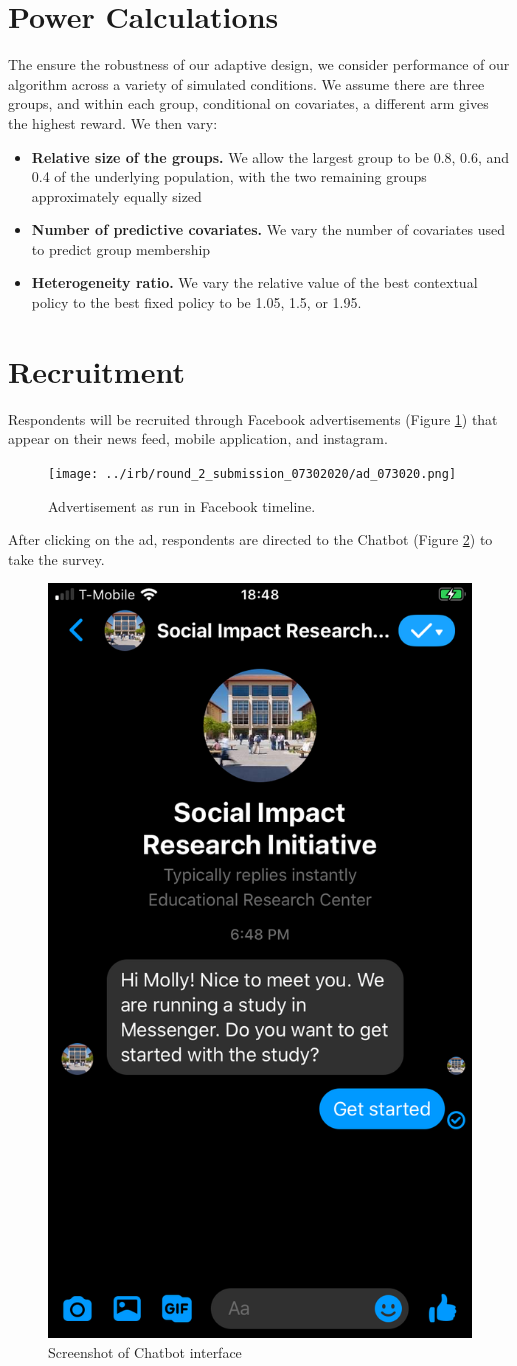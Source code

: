 \documentclass[letterpaper, 12pt, parskip=full,]{scrartcl}
\begin{document}
\section{Power Calculations}
The ensure the robustness of our adaptive design, we consider performance of our algorithm across a variety of simulated conditions. We assume there are three groups, and within each group, conditional on covariates, a different arm gives the highest reward. We then vary:
\begin{itemize}
\item \textbf{Relative size of the groups.} We allow the largest group to be 0.8, 0.6, and 0.4 of the underlying population, with the two remaining groups approximately equally sized
\item \textbf{Number of predictive covariates.} We vary the number of covariates used to predict group membership
\item \textbf{Heterogeneity ratio.} We vary the relative value of the best contextual policy to the best fixed policy to be 1.05, 1.5, or 1.95. 
\end{itemize}



\clearpage



\clearpage
\appendix

\section{Recruitment}\label{appendix:recruitment}
Respondents will be recruited through Facebook advertisements (Figure \ref{fig:ad}) that appear on their news feed, mobile application, and instagram. 

\begin{figure}[htb]
\centering
\caption{Advertisement as run in Facebook timeline.}
\label{fig:ad}
\texttt{[image: ../irb/round\_2\_submission\_07302020/ad\_073020.png]}
\end{figure}

After clicking on the ad, respondents are directed to the Chatbot (Figure \ref{fig:chatbot}) to take the survey.

\begin{figure}[htb]
\centering
\caption{Screenshot of Chatbot interface}
\label{fig:chatbot}
\includegraphics[width=.25\textwidth]{chatbot_image.png}
\end{figure}
\end{document}
